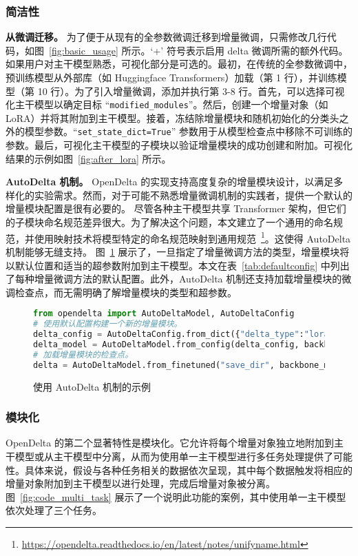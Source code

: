 \subsubsection{简洁性}

\textbf{从微调迁移。} 为了便于从现有的全参数微调迁移到增量微调，只需修改几行代码，如图~\ref{fig:basic_usage} 所示。`+' 符号表示启用 delta 微调所需的额外代码。如果用户对主干模型熟悉，可视化部分是可选的。最初，在传统的全参数微调中，预训练模型从外部库（如 Huggingface Transformers）加载（第 1 行），并训练模型（第 10 行）。为了引入增量微调，添加并执行第 3-8 行。首先，可以选择可视化主干模型以确定目标 ``\texttt{modified\_modules}''。然后，创建一个增量对象（如 LoRA）并将其附加到主干模型。接着，冻结除增量模块和随机初始化的分类头之外的模型参数。``\texttt{set\_state\_dict=True}'' 参数用于从模型检查点中移除不可训练的参数。最后，可视化主干模型的子模块以验证增量模块的成功创建和附加。可视化结果的示例如图~\ref{fig:after_lora} 所示。

\textbf{AutoDelta 机制。} OpenDelta 的实现支持高度复杂的增量模块设计，以满足多样化的实验需求。然而，对于可能不熟悉增量微调机制的实践者，提供一个默认的增量模块配置是很有必要的。
尽管各种主干模型共享 Transformer 架构，但它们的子模块命名规范差异很大。为了解决这个问题，本文建立了一个通用的命名规范，并使用映射技术将模型特定的命名规范映射到通用规范~\footnote{\url{https://opendelta.readthedocs.io/en/latest/notes/unifyname.html}}。这使得 AutoDelta 机制能够无缝支持。
图~\ref{fig:autodelta} 展示了，一旦指定了增量微调方法的类型，增量模块将以默认位置和适当的超参数附加到主干模型。本文在表~\ref{tab:defaultconfig} 中列出了每种增量微调方法的默认配置。此外，AutoDelta 机制还支持加载增量模块的微调检查点，而无需明确了解增量模块的类型和超参数。

\begin{figure}[hbt!]
\centering
\begin{minipage}{0.94\linewidth}
\begin{lstlisting}[language=Python]
from opendelta import AutoDeltaModel, AutoDeltaConfig
# 使用默认配置构建一个新的增量模块。
delta_config = AutoDeltaConfig.from_dict({"delta_type":"lora"})
delta_model = AutoDeltaModel.from_config(delta_config, backbone_model)
# 加载增量模块的检查点。
delta = AutoDeltaModel.from_finetuned("save_dir", backbone_model)
\end{lstlisting}
\end{minipage}
\caption{使用 AutoDelta 机制的示例}
\label{fig:autodelta}
\end{figure}

\subsubsection{模块化}
OpenDelta 的第二个显著特性是模块化。它允许将每个增量对象独立地附加到主干模型或从主干模型中分离，从而为使用单一主干模型进行多任务处理提供了可能性。具体来说，假设与各种任务相关的数据依次呈现，其中每个数据触发将相应的增量对象附加到主干模型以进行处理，完成后增量对象被分离。图~\ref{fig:code_multi_task} 展示了一个说明此功能的案例，其中使用单一主干模型依次处理了三个任务。

